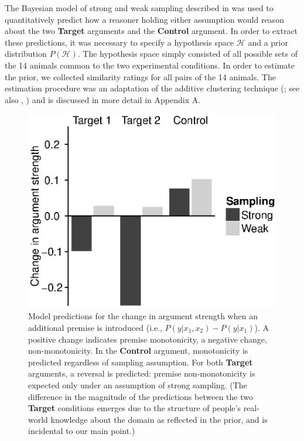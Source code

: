 \documentclass[doc,12pt]{apa}
\newcommand{\bigh}{\mathcal{H}}
\begin{document}
The Bayesian model of strong and weak sampling described in  was used to quantitatively predict how a reasoner holding either assumption would reason about the two {\bf Target} arguments and the {\bf Control} argument. In order to extract these predictions, it was necessary to specify a hypothesis space $\bigh$ and a prior distribution $P(\bigh)$.  The hypothesis space simply consisted of all possible sets of the 14 animals common to the two experimental conditions. In order to estimate the prior, we collected similarity ratings for all pairs of the 14 animals. The estimation procedure was an adaptation of the additive clustering technique (; see also , ) and is discussed in more detail in Appendix A.
%
\begin{figure}[t]
\begin{center}
\includegraphics[scale=0.60]{predictions.eps}
\end{center}
\vspace{-5mm}
\caption{%
  Model predictions for the change in argument strength when an additional premise is introduced (i.e., $P(y|x_1,x_2)-P(y|x_1)$).
  A positive change indicates premise monotonicity, a negative change, non-monotonicity.
  In the {\bf Control} argument, monotonicity is predicted regardless of sampling assumption. For
  both {\bf Target} arguments, a reversal is predicted: premise non-monotonicity is
  expected only under an assumption of strong sampling. (The difference in the magnitude of the predictions between the two {\bf Target} conditions emerges due to the structure of people's real-world
  knowledge about the domain as reflected in the prior, and is incidental to our main point.) %
}
\label{fig:predictions}
\end{figure}
\end{document}
